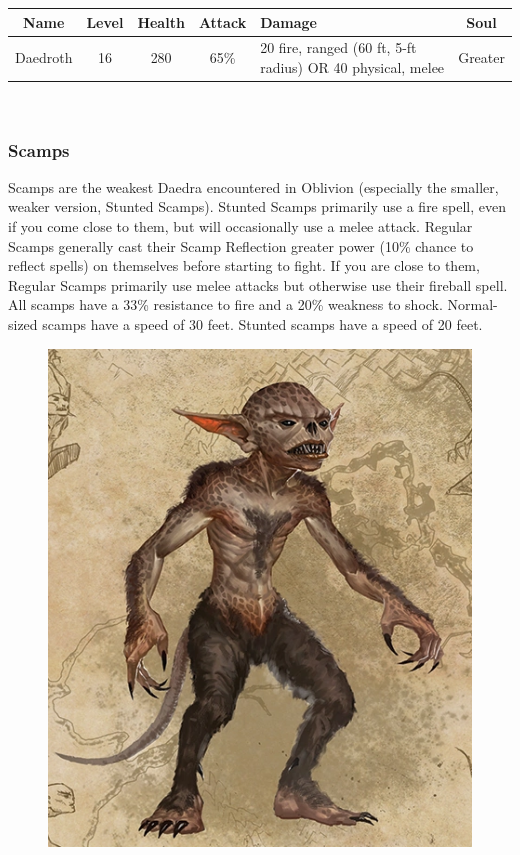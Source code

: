 \documentclass[12pt]{book}
\begin{document}
\begin{tabular}{|c|c|c|c|p{}|c|}
\hline
Name & Level & Health & Attack & Damage & Soul\\ \hline
Daedroth & 16 & 280 & 65\% & 20 fire, ranged (60 ft, 5-ft radius) OR 40 physical, melee & Greater\\ \hline
\end{tabular}\\

\subsubsection{Scamps}
Scamps are the weakest Daedra encountered in Oblivion (especially the smaller, weaker version, Stunted Scamps). Stunted Scamps primarily use a fire spell, even if you come close to them, but will occasionally use a melee attack. Regular Scamps generally cast their Scamp Reflection greater power (10\% chance to reflect spells) on themselves before starting to fight. If you are close to them, Regular Scamps primarily use melee attacks but otherwise use their fireball spell. All scamps have a 33\% resistance to fire and a 20\% weakness to shock. Normal-sized scamps have a speed of 30 feet. Stunted scamps have a speed of 20 feet.

\begin{figure}[h]
	\centering
	\includegraphics[scale=0.75]{scamp.png}
\end{figure}
\end{document}
